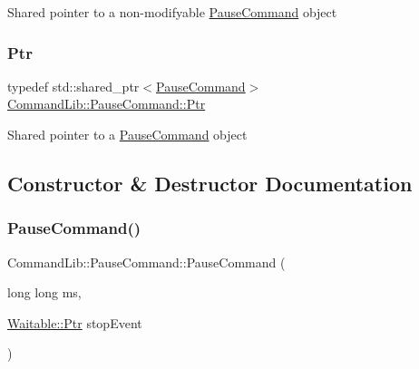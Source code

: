 Shared pointer to a non-\/modifyable \mbox{\hyperlink{class_command_lib_1_1_pause_command}{Pause\+Command}} object

\mbox{\label{class_command_lib_1_1_pause_command_ac4c00381b2c560c5d072a0eedaefa92b}} 
\subsubsection{\texorpdfstring{Ptr}{Ptr}}
{\footnotesize\ttfamily typedef std\+::shared\+\_\+ptr$<$\mbox{\hyperlink{class_command_lib_1_1_pause_command}{Pause\+Command}}$>$ \mbox{\hyperlink{class_command_lib_1_1_pause_command_ac4c00381b2c560c5d072a0eedaefa92b}{Command\+Lib\+::\+Pause\+Command\+::\+Ptr}}}



Shared pointer to a \mbox{\hyperlink{class_command_lib_1_1_pause_command}{Pause\+Command}} object



\subsection{Constructor \& Destructor Documentation}
\mbox{\label{class_command_lib_1_1_pause_command_a777f5a05a5ed78abeafcfbc7e1d27072}} 
\subsubsection{\texorpdfstring{Pause\+Command()}{PauseCommand()}}
{\footnotesize\ttfamily Command\+Lib\+::\+Pause\+Command\+::\+Pause\+Command (\begin{DoxyParamCaption}\item[{long long}]{ms,  }\item[{\mbox{\hyperlink{class_command_lib_1_1_waitable_ac74b6b91e48220146eada76a31cf2d9b}{Waitable\+::\+Ptr}}}]{stop\+Event }\end{DoxyParamCaption})\hspace{0.3cm}{\ttfamily [protected]}}



